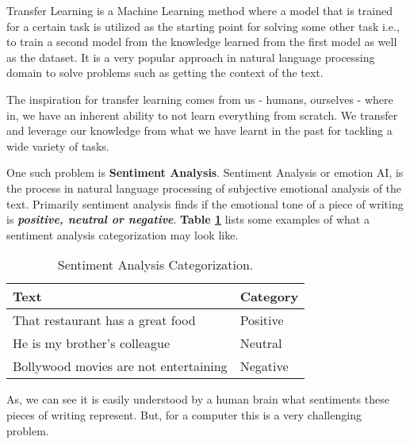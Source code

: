 \documentclass[12pt]{article}
\begin{document}
\begin{multicols}{2}
Transfer Learning is a Machine Learning method where a model that is trained for a certain task is utilized as the starting point for solving some other task i.e., to train a second model from the knowledge learned from the first model as well as the dataset. It is a very popular approach in natural language processing domain to solve problems such as getting the context of the text.

The inspiration for transfer learning comes from us - humans, ourselves - where in, we have an inherent ability to not learn everything from scratch. We transfer and leverage our knowledge from what we have learnt in the past for tackling a wide variety of tasks.\cite{sarkar_deep_2018}

One such problem is \textbf{Sentiment Analysis}. Sentiment Analysis or emotion AI, is the process in natural language processing  of subjective emotional analysis of the text. Primarily sentiment analysis finds if the emotional tone of a piece of writing is \textbf{\textit{positive, neutral or negative}}. \textbf{Table \ref{table: category}} lists some examples of what a sentiment analysis categorization may look like.
\begin{table}[H]
\caption{ Sentiment Analysis Categorization.\label{table: category}}

\begin{tabularx}{\columnwidth}{| X | X |}
\hline
Text & Category \\ [0.5ex]
\hline
\hline
That restaurant has a great food & Positive \\ [0.5ex]
\hline
He is my brother's colleague & Neutral \\ [0.5ex]
\hline
Bollywood movies are not entertaining & Negative \\ [0.5ex]
\hline
\end{tabularx}
\end{table}

As, we can see it is easily understood by a human brain what sentiments these pieces of writing represent. But, for a computer this is a very challenging problem.
\end{multicols}
\printbibliography
\end{document}
